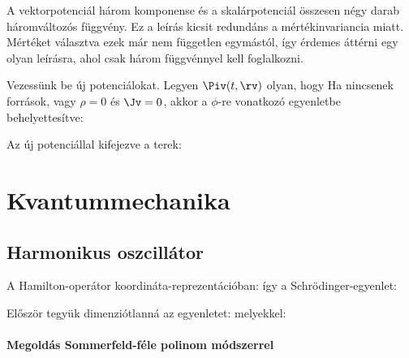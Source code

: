    A vektorpotenciál három komponense és a skalárpotenciál összesen négy darab háromváltozós függvény.
   Ez a leírás kicsit redundáns a mértékinvariancia miatt.
   Mértéket választva ezek már nem független egymástól, így érdemes áttérni egy olyan leírásra, ahol csak három függvénnyel kell foglalkozni.
   
   Vezessünk be új potenciálokat.
   Legyen $\Piv(t,\rv)$ olyan, hogy 
   Ha nincsenek források, vagy $\rho=0$ és $\Jv=0$, akkor a $\phi$-re vonatkozó egyenletbe behelyettesítve:
   
   Az új potenciállal kifejezve a terek:
  
 \section{Kvantummechanika}
  
  \subsection{Harmonikus oszcillátor}
   
   A Hamilton-operátor koordináta-reprezentációban:
   így a Schrödinger-egyenlet:
   
   Először tegyük dimenziótlanná az egyenletet:
    melyekkel:
    
   \paragraph{Megoldás Sommerfeld-féle polinom módszerrel}
    
